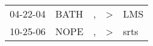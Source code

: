 \begin{supertabular}{lllll}
 04-22-04 &  BATH &  , &  \textgreater &   LMS \\
 10-25-06 &  NOPE &  , &  \textgreater &  srts \\
\end{supertabular}
